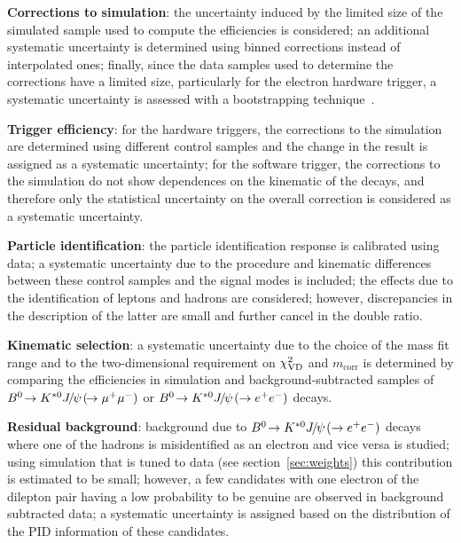 \documentclass[12pt,a4paper]{article}
\def\Ppsi        {\ensuremath{\uppsi}\xspace}
\def\PB      {\ensuremath{\mathrm{B}}\xspace}
\def\PJ      {\ensuremath{\mathrm{J}}\xspace}
\def\PK      {\ensuremath{\mathrm{K}}\xspace}
\def\Pe      {\ensuremath{\mathrm{e}}\xspace}
\def\Ppsi        {\ensuremath{\psi}\xspace}
\def\PB      {\ensuremath{B}\xspace}
\def\PJ      {\ensuremath{J}\xspace}
\def\PK      {\ensuremath{K}\xspace}
\def\Pe      {\ensuremath{e}\xspace}
\def\epem       {\ensuremath{\Pe^+\Pe^-}\xspace}
\def\kaon  {\ensuremath{\PK}\xspace}
\def\Kstarz  {\ensuremath{\kaon^{*0}}\xspace}
\def\B       {\ensuremath{\PB}\xspace}
\def\Bd      {\ensuremath{\B^0}\xspace}
\def\jpsi     {\ensuremath{{\PJ\mskip -3mu/\mskip -2mu\Ppsi\mskip 2mu}}\xspace}
\newcommand{\decay}[2]{\ensuremath{#1\!\to #2}\xspace}         \def\ra                 {\ensuremath{\rightarrow}\xspace}
\def\to                 {\ensuremath{\rightarrow}\xspace}
\def\mcorr{\ensuremath{m_{\textrm{corr}}}\xspace}
\def\chisqfd{\ensuremath{\chi^2_{\rm VD}}\xspace}
\def\BdToKstJPsmm{\mbox{\decay{\Bd}{\Kstarz \jpsi(\decay{}{\mumu})}}\xspace}
\def\BdToKstJPsee{\mbox{\decay{\Bd}{\Kstarz \jpsi(\to\epem)}}\xspace}
\begin{document}
\begin{description}

\item \textbf{Corrections to simulation}:
the uncertainty induced by the limited size of the simulated sample used to compute the efficiencies is considered;
an additional systematic uncertainty is determined using binned corrections instead of interpolated ones;
finally, since the data samples used to determine the corrections have a limited size, particularly for the electron hardware trigger, a systematic uncertainty is assessed with a bootstrapping technique~\cite{bootstrap}.

\item \textbf{Trigger efficiency}:
for the hardware triggers, the corrections to the simulation are determined using different control samples and
the change in the result is assigned as a systematic uncertainty;
for the software trigger, the corrections to the simulation do not show dependences on the kinematic of the decays, and therefore only the statistical uncertainty on the overall correction is considered as a systematic uncertainty. 

\item \textbf{Particle identification}:
the particle identification response is calibrated using data;
a systematic uncertainty due to the procedure and kinematic differences between these control samples and the signal modes is included;
the effects due to the identification of leptons and hadrons are considered;
however, discrepancies in the description of the latter are small and further cancel in the double ratio.

\item \textbf{Kinematic selection}:
a systematic uncertainty due to the choice of the mass fit range and to the two-dimensional requirement on \chisqfd and \mcorr is determined by comparing the efficiencies in simulation and background-subtracted samples of \BdToKstJPsmm or \BdToKstJPsee decays. 

\item \textbf{Residual background}:
background due to \BdToKstJPsee decays where one of the hadrons is misidentified as an electron and vice versa is studied;
using simulation that is tuned to data (see section~\ref{sec:weights}) this contribution is estimated to be small;
however, a few candidates with one electron of the dilepton pair having a low probability to be genuine are observed in background subtracted data;
a systematic uncertainty is assigned based on the distribution of the PID information of these candidates.


\end{description}
\end{document}
